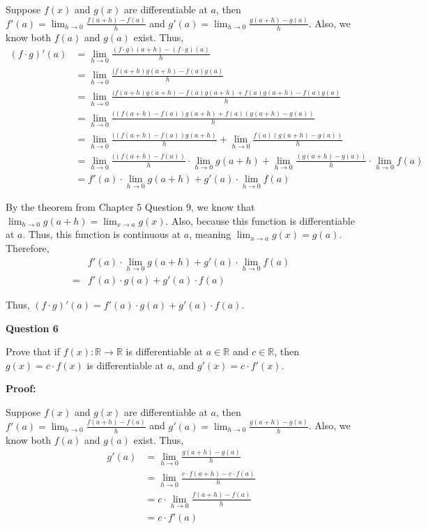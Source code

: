 \documentclass[a4paper,12pt]{report}
\begin{document}
\noindent
Suppose $f(x)$ and $g(x)$ are differentiable at $a$, then $f'(a)=\displaystyle{\lim_{h\to 0}}\frac{f(a+h)-f(a)}{h}$ and $g'(a)=\displaystyle{\lim_{h\to 0}}\frac{g(a+h)-g(a)}{h}$. Also, we know both $f(a)$ and $g(a)$ exist. 
Thus, 
\begin{align*}
(f\cdot{g})'(a) &= \displaystyle{\lim_{h\to 0}}\frac{(f\cdot{g})(a+h)-(f\cdot{g})(a)}{h}\\
&= \displaystyle{\lim_{h\to 0}}\frac{(f(a+h)g(a+h)-f(a)g(a)}{h}\\
&= \displaystyle{\lim_{h\to 0}}\frac{(f(a+h)g(a+h)-f(a)g(a+h)+f(a)g(a+h)-f(a)g(a)}{h}\\
&= \displaystyle{\lim_{h\to 0}}\frac{((f(a+h)-f(a))g(a+h)+f(a)(g(a+h)-g(a))}{h}\\
&= \displaystyle{\lim_{h\to 0}}\frac{((f(a+h)-f(a))g(a+h)}{h}+\displaystyle{\lim_{h\to 0}}\frac{f(a)(g(a+h)-g(a))}{h}\\
&= \displaystyle{\lim_{h\to 0}}\frac{((f(a+h)-f(a))}{h}\cdot{\displaystyle{\lim_{h\to 0}}g(a+h)}+\displaystyle{\lim_{h\to 0}}\frac{(g(a+h)-g(a))}{h}\cdot{\displaystyle{\lim_{h\to 0}}f(a)}\\
&= f'(a)\cdot{\displaystyle{\lim_{h\to 0}}g(a+h)}+g'(a)\cdot{\displaystyle{\lim_{h\to 0}}f(a)}
\end{align*}

\noindent
By the theorem from Chapter 5 Question 9, we know that $\displaystyle{\lim_{h\to 0}}g(a+h)=\displaystyle{\lim_{x\to a}}g(x)$. Also, because this function is differentiable at $a$. Thus, this function is continuous at $a$, meaning $\displaystyle{\lim_{x\to a}}g(x)=g(a)$. Therefore, 
\begin{align*}
& f'(a)\cdot{\displaystyle{\lim_{h\to 0}}g(a+h)}+g'(a)\cdot{\displaystyle{\lim_{h\to 0}}f(a)}\\
= &f'(a)\cdot{g(a)}+g'(a)\cdot{f(a)}
\end{align*}


\noindent
Thus, $(f\cdot{g})'(a) = f'(a)\cdot{g(a)}+g'(a)\cdot{f(a)}$.

\pagebreak

\noindent
\textbf{Question 6}

\noindent
Prove that if $f(x):\mathbb{R}\rightarrow \mathbb{R}$ is differentiable at $a\in \mathbb{R}$ and $c\in \mathbb{R}$, then $g(x)=c\cdot{f(x)}$ is differentiable at $a$, and $g'(x) = c\cdot{f'(x)}$.

\noindent
\textbf{Proof: }

\noindent
Suppose $f(x)$ and $g(x)$ are differentiable at $a$, then $f'(a)=\displaystyle{\lim_{h\to 0}}\frac{f(a+h)-f(a)}{h}$ and $g'(a)=\displaystyle{\lim_{h\to 0}}\frac{g(a+h)-g(a)}{h}$. Also, we know both $f(a)$ and $g(a)$ exist. 
Thus, 
\begin{align*}
g'(a)&=
\displaystyle{\lim_{h\to 0}}\frac{g(a+h)-g(a)}{h}\\
&=\displaystyle{\lim_{h\to 0}}\frac{c\cdot{f(a+h)}-c\cdot{f(a)}}{h}\\
&=c\cdot{\displaystyle{\lim_{h\to 0}}\frac{f(a+h)-f(a)}{h}}\\
&=c\cdot{f'(a)}
\end{align*}
\end{document}
